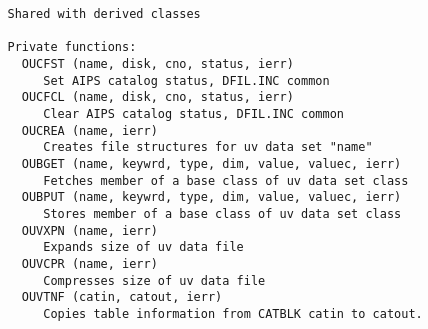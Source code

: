 {\begin{verbatim}
   Shared with derived classes

   Private functions:
     OUCFST (name, disk, cno, status, ierr)
        Set AIPS catalog status, DFIL.INC common
     OUCFCL (name, disk, cno, status, ierr)
        Clear AIPS catalog status, DFIL.INC common
     OUCREA (name, ierr)
        Creates file structures for uv data set "name"
     OUBGET (name, keywrd, type, dim, value, valuec, ierr)
        Fetches member of a base class of uv data set class
     OUBPUT (name, keywrd, type, dim, value, valuec, ierr)
        Stores member of a base class of uv data set class
     OUVXPN (name, ierr)
        Expands size of uv data file
     OUVCPR (name, ierr)
        Compresses size of uv data file
     OUVTNF (catin, catout, ierr)
        Copies table information from CATBLK catin to catout.
\end{verbatim}}

